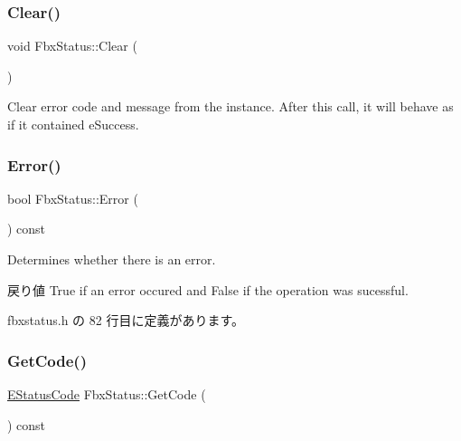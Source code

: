 \subsubsection{\texorpdfstring{Clear()}{Clear()}}
{\footnotesize\ttfamily void Fbx\+Status\+::\+Clear (\begin{DoxyParamCaption}{ }\end{DoxyParamCaption})}



Clear error code and message from the instance. After this call, it will behave as if it contained e\+Success. 

\mbox{\label{class_fbx_status_ab698013e2bdef14baef8842d0dfa00ea}} 
\subsubsection{\texorpdfstring{Error()}{Error()}}
{\footnotesize\ttfamily bool Fbx\+Status\+::\+Error (\begin{DoxyParamCaption}{ }\end{DoxyParamCaption}) const\hspace{0.3cm}{\ttfamily [inline]}}

Determines whether there is an error. \begin{DoxyReturn}{戻り値}
{\ttfamily True} if an error occured and {\ttfamily False} if the operation was sucessful. 
\end{DoxyReturn}


 fbxstatus.\+h の 82 行目に定義があります。

\mbox{\label{class_fbx_status_a342ecfe81651d2c99785cac9592a41dc}} 
\subsubsection{\texorpdfstring{Get\+Code()}{GetCode()}}
{\footnotesize\ttfamily \hyperlink{class_fbx_status_a6a631d5d95b28e31a19aabd5f5809ecc}{E\+Status\+Code} Fbx\+Status\+::\+Get\+Code (\begin{DoxyParamCaption}{ }\end{DoxyParamCaption}) const\hspace{0.3cm}{\ttfamily [inline]}}



